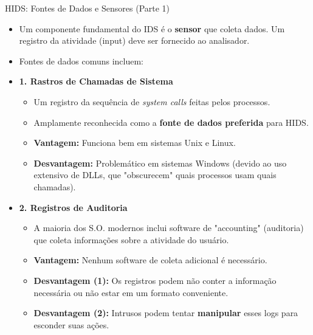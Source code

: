\begin{frame}{HIDS: Fontes de Dados e Sensores (Parte 1)}
    \begin{itemize}
        \item Um componente fundamental do IDS é o \textbf{sensor} que coleta dados. Um registro da atividade (input) deve ser fornecido ao analisador.
        \item Fontes de dados comuns incluem:

        \item \textbf{1. Rastros de Chamadas de Sistema }
              \begin{itemize}
                  \item Um registro da sequência de \textit{system calls} feitas pelos processos.
                  \item Amplamente reconhecida como a \textbf{fonte de dados preferida} para HIDS.
                  \item \textbf{Vantagem:} Funciona bem em sistemas Unix e Linux.
                  \item \textbf{Desvantagem:} Problemático em sistemas Windows (devido ao uso extensivo de DLLs, que "obscurecem" quais processos usam quais chamadas).
              \end{itemize}

        \item \textbf{2. Registros de Auditoria }
              \begin{itemize}
                  \item A maioria dos S.O. modernos inclui software de "accounting" (auditoria) que coleta informações sobre a atividade do usuário.
                  \item \textbf{Vantagem:} Nenhum software de coleta adicional é necessário.
                  \item \textbf{Desvantagem (1):} Os registros podem não conter a informação necessária ou não estar em um formato conveniente.
                  \item \textbf{Desvantagem (2):} Intrusos podem tentar \textbf{manipular} esses logs para esconder suas ações.
              \end{itemize}
    \end{itemize}
\end{frame}

